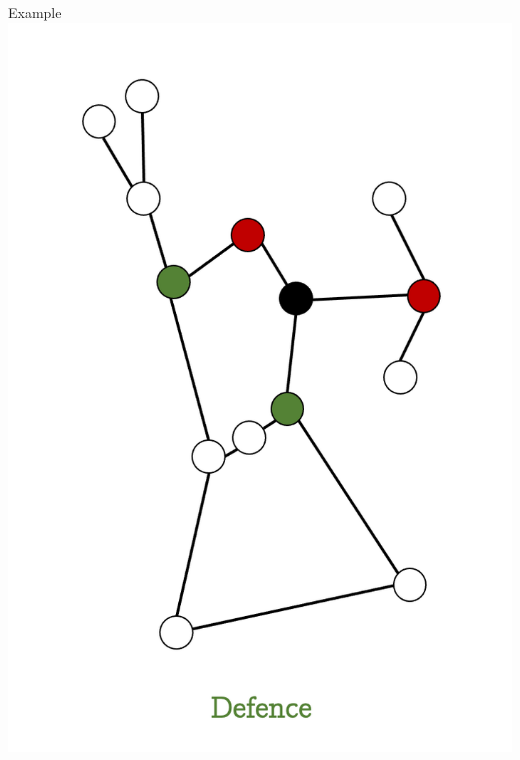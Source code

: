 \documentclass[unknownkeysallowed]{beamer}
\begin{document}
\begin{frame}{Example}
\centering\includegraphics[height=0.8\textheight]{assets/eg-fire/4}
\end{frame}
\end{document}
